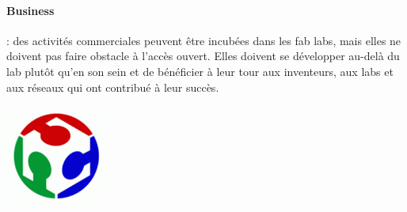 \paragraph{Business} : des activités commerciales peuvent être incubées dans les fab labs, mais elles ne doivent pas faire obstacle à l'accès ouvert. Elles doivent se développer au-delà du lab plutôt qu'en son sein et de bénéficier à leur tour aux inventeurs, aux labs et aux réseaux qui ont contribué à leur succès.
\vfill
\begin{center}
  \includegraphics[width=0.25\textwidth]{fablab-logo.png}
\end{center}
\vfill

